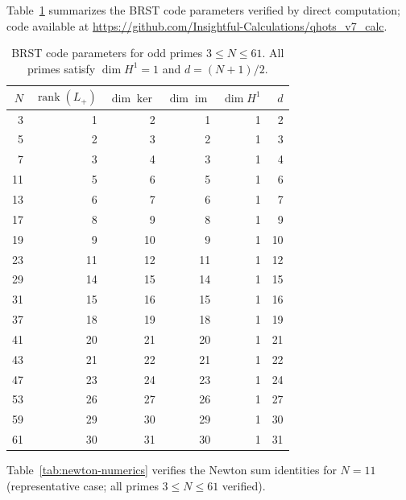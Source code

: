 \documentclass[aip,jmp,reprint,superscriptaddress,floatfix,nofootinbib]{revtex4-2}
\theoremstyle{definition}
\theoremstyle{remark}
\begin{document}
Table~\ref{tab:brst-numerics} summarizes the BRST code parameters
verified by direct computation; code available at
\url{https://github.com/Insightful-Calculations/qhots_v7_calc}.

\begin{table}[ht]
\centering
\caption{BRST code parameters for odd primes $3 \le N \le 61$.
  All primes satisfy $\dim H^1 = 1$ and $d = (N{+}1)/2$.}
\label{tab:brst-numerics}
\begin{tabular}{rrrrrr}
\toprule
$N$ & $\operatorname{rank}(L_+)$ & $\dim\ker$ & $\dim\operatorname{im}$ & $\dim H^1$ & $d$ \\
\midrule
3   & 1 & 2 & 1 & 1 & 2 \\
5   & 2 & 3 & 2 & 1 & 3 \\
7   & 3 & 4 & 3 & 1 & 4 \\
11  & 5 & 6 & 5 & 1 & 6 \\
13  & 6 & 7 & 6 & 1 & 7 \\
17  & 8 & 9 & 8 & 1 & 9 \\
19  & 9 & 10 & 9 & 1 & 10 \\
23  & 11 & 12 & 11 & 1 & 12 \\
29  & 14 & 15 & 14 & 1 & 15 \\
31  & 15 & 16 & 15 & 1 & 16 \\
37  & 18 & 19 & 18 & 1 & 19 \\
41  & 20 & 21 & 20 & 1 & 21 \\
43  & 21 & 22 & 21 & 1 & 22 \\
47  & 23 & 24 & 23 & 1 & 24 \\
53  & 26 & 27 & 26 & 1 & 27 \\
59  & 29 & 30 & 29 & 1 & 30 \\
61  & 30 & 31 & 30 & 1 & 31 \\
\bottomrule
\end{tabular}
\end{table}

Table~\ref{tab:newton-numerics} verifies the Newton sum identities
for $N = 11$ (representative case; all primes $3 \le N \le 61$
verified).
\end{document}
